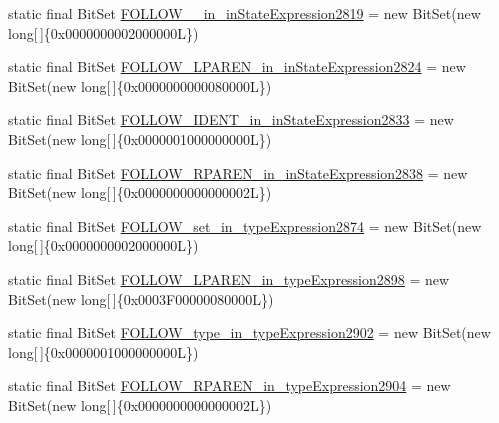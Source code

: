 \begin{DoxyCompactItemize}
\item 
static final Bit\-Set \hyperlink{classorg_1_1tzi_1_1use_1_1parser_1_1shell_1_1_shell_command_parser_a4cf8d8dbe31b7f6eaf8d1a5d6be6e54b}{F\-O\-L\-L\-O\-W\-\_\-\_\-in\-\_\-in\-State\-Expression2819} = new Bit\-Set(new long\mbox{[}$\,$\mbox{]}\{0x0000000002000000\-L\})
\item 
static final Bit\-Set \hyperlink{classorg_1_1tzi_1_1use_1_1parser_1_1shell_1_1_shell_command_parser_ae69ea9e92158897b01ba7b2f4dba9b6b}{F\-O\-L\-L\-O\-W\-\_\-\-L\-P\-A\-R\-E\-N\-\_\-in\-\_\-in\-State\-Expression2824} = new Bit\-Set(new long\mbox{[}$\,$\mbox{]}\{0x0000000000080000\-L\})
\item 
static final Bit\-Set \hyperlink{classorg_1_1tzi_1_1use_1_1parser_1_1shell_1_1_shell_command_parser_a17fec76e2d57443d569ce364a66b6f67}{F\-O\-L\-L\-O\-W\-\_\-\-I\-D\-E\-N\-T\-\_\-in\-\_\-in\-State\-Expression2833} = new Bit\-Set(new long\mbox{[}$\,$\mbox{]}\{0x0000001000000000\-L\})
\item 
static final Bit\-Set \hyperlink{classorg_1_1tzi_1_1use_1_1parser_1_1shell_1_1_shell_command_parser_a7f0dee6098626f72dca22a00a80c10b9}{F\-O\-L\-L\-O\-W\-\_\-\-R\-P\-A\-R\-E\-N\-\_\-in\-\_\-in\-State\-Expression2838} = new Bit\-Set(new long\mbox{[}$\,$\mbox{]}\{0x0000000000000002\-L\})
\item 
static final Bit\-Set \hyperlink{classorg_1_1tzi_1_1use_1_1parser_1_1shell_1_1_shell_command_parser_a46e2f353f9679a84addae7e9df4aebf7}{F\-O\-L\-L\-O\-W\-\_\-set\-\_\-in\-\_\-type\-Expression2874} = new Bit\-Set(new long\mbox{[}$\,$\mbox{]}\{0x0000000002000000\-L\})
\item 
static final Bit\-Set \hyperlink{classorg_1_1tzi_1_1use_1_1parser_1_1shell_1_1_shell_command_parser_a3fd5fd9bbc92621d4f7dc311a297311c}{F\-O\-L\-L\-O\-W\-\_\-\-L\-P\-A\-R\-E\-N\-\_\-in\-\_\-type\-Expression2898} = new Bit\-Set(new long\mbox{[}$\,$\mbox{]}\{0x0003\-F00000080000\-L\})
\item 
static final Bit\-Set \hyperlink{classorg_1_1tzi_1_1use_1_1parser_1_1shell_1_1_shell_command_parser_ab557d592b3fd370dc199a515ebe6d642}{F\-O\-L\-L\-O\-W\-\_\-type\-\_\-in\-\_\-type\-Expression2902} = new Bit\-Set(new long\mbox{[}$\,$\mbox{]}\{0x0000001000000000\-L\})
\item 
static final Bit\-Set \hyperlink{classorg_1_1tzi_1_1use_1_1parser_1_1shell_1_1_shell_command_parser_abf7fc0158bc738e36d5e32bbb4118538}{F\-O\-L\-L\-O\-W\-\_\-\-R\-P\-A\-R\-E\-N\-\_\-in\-\_\-type\-Expression2904} = new Bit\-Set(new long\mbox{[}$\,$\mbox{]}\{0x0000000000000002\-L\})
\item 

\end{DoxyCompactItemize}
